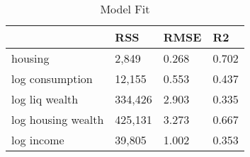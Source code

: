 \begin{table}[htbp]
\caption{\label{clabel} Model Fit}\centering\medskip
\begin{tabular}{llll} \hline \hline
 & RSS  & RMSE  & R2  \\  \hline 
housing &     2,849 &     0.268 &     0.702 \\  
log consumption &    12,155 &     0.553 &     0.437 \\  
log liq wealth &   334,426 &     2.903 &     0.335 \\  
log housing wealth &   425,131 &     3.273 &     0.667 \\  
log income &    39,805 &     1.002 &     0.353 \\  
\hline \hline \end{tabular}
\end{table}
